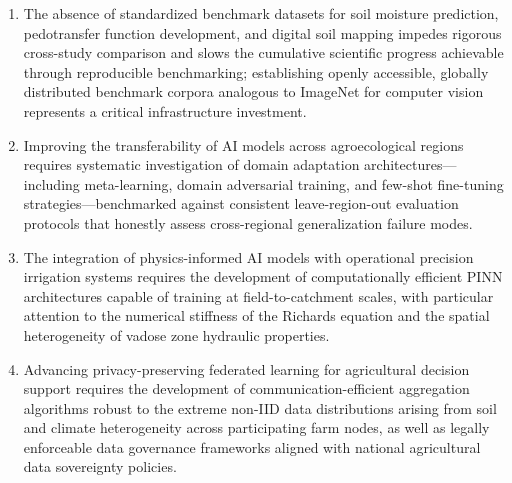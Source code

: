 \documentclass[land,review,accept,pdftex,oneauthor]{Definitions/mdpi}
\begin{document}
\begin{enumerate}
\item The absence of standardized benchmark datasets for soil moisture prediction,
pedotransfer function development, and digital soil mapping impedes rigorous
cross-study comparison and slows the cumulative scientific progress achievable
through reproducible benchmarking; establishing openly accessible, globally
distributed benchmark corpora analogous to ImageNet for computer vision represents
a critical infrastructure investment.
\item Improving the transferability of AI models across agroecological regions
requires systematic investigation of domain adaptation architectures---including
meta-learning, domain adversarial training, and few-shot fine-tuning
strategies---benchmarked against consistent leave-region-out evaluation protocols
that honestly assess cross-regional generalization failure modes.
\item The integration of physics-informed AI models with operational precision
irrigation systems requires the development of computationally efficient PINN
architectures capable of training at field-to-catchment scales, with particular
attention to the numerical stiffness of the Richards equation and the spatial
heterogeneity of vadose zone hydraulic properties.
\item Advancing privacy-preserving federated learning for agricultural decision
support requires the development of communication-efficient aggregation algorithms
robust to the extreme non-IID data distributions arising from soil and climate
heterogeneity across participating farm nodes, as well as legally enforceable data
governance frameworks aligned with national agricultural data sovereignty policies.
\end{enumerate}
\end{document}

